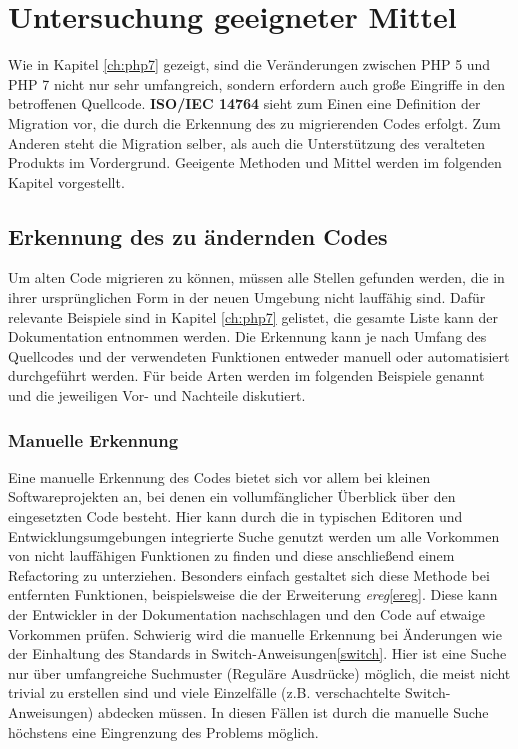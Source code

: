 \chapter{Untersuchung geeigneter Mittel}\label{ch:tools} 

Wie in Kapitel \ref{ch:php7} gezeigt, sind die Veränderungen zwischen \acs{PHP} 5 und \acs{PHP} 7 nicht nur sehr umfangreich, sondern erfordern auch große Eingriffe 
in den betroffenen Quellcode. \textbf{ISO/IEC 14764} sieht zum Einen eine Definition der Migration vor, die durch die Erkennung 
des zu migrierenden Codes erfolgt. Zum Anderen steht die Migration selber, als auch die Unterstützung des veralteten Produkts 
im Vordergrund. Geeigente Methoden und Mittel werden im folgenden Kapitel vorgestellt. 

\section{Erkennung des zu ändernden Codes}
    Um alten Code migrieren zu können, müssen alle Stellen gefunden werden, die in ihrer ursprünglichen Form in der neuen Umgebung nicht lauffähig sind. Dafür relevante
    Beispiele sind in Kapitel \ref{ch:php7} gelistet, die gesamte Liste kann der Dokumentation entnommen werden. Die Erkennung kann je nach Umfang des Quellcodes
    und der verwendeten Funktionen entweder manuell oder automatisiert durchgeführt werden. Für beide Arten werden im folgenden Beispiele genannt und die jeweiligen
    Vor- und Nachteile diskutiert.
    \subsection{Manuelle Erkennung}
        Eine manuelle Erkennung des Codes bietet sich vor allem bei kleinen Softwareprojekten an, bei denen ein vollumfänglicher Überblick über den eingesetzten Code
        besteht. Hier kann durch die in typischen Editoren und Entwicklungsumgebungen integrierte Suche genutzt werden um alle Vorkommen von nicht lauffähigen
        Funktionen zu finden und diese anschließend einem Refactoring zu unterziehen. Besonders einfach gestaltet sich diese Methode bei entfernten Funktionen,
        beispielsweise die der Erweiterung \textit{ereg}\ref{ereg}. Diese kann der Entwickler in der Dokumentation nachschlagen und den Code auf etwaige Vorkommen prüfen.
        Schwierig wird die manuelle Erkennung bei Änderungen wie der Einhaltung des Standards in Switch-Anweisungen\ref{switch}. Hier ist eine Suche nur über umfangreiche
        Suchmuster (Reguläre Ausdrücke) möglich, die meist nicht trivial zu erstellen sind und viele Einzelfälle (z.B. verschachtelte Switch-Anweisungen) abdecken müssen.
        In diesen Fällen ist durch die manuelle Suche höchstens eine Eingrenzung des Problems möglich.
